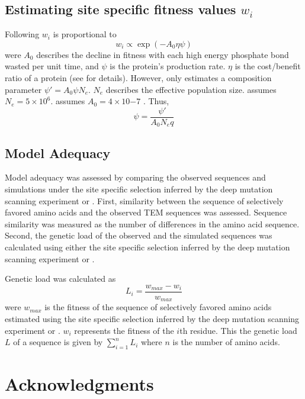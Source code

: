 \documentclass[12pt]{article}
\begin{document}
\subsection*{Estimating site specific fitness values $w_i$}

Following \citet{beaulieu2018} $w_i$ is proportional to
\begin{equation}
w_i \propto \exp(-A_0\eta\psi)
\end{equation}
were $A_0$ describes the decline in fitness with each high energy phosphate bond wasted per unit time, and $\psi$ is the protein's production rate.
$\eta$ is the cost/benefit ratio of a protein (see \citep{beaulieu2018} for details). 
However, \selac only estimates a composition parameter $\psi' = A_0\psi N_e$.
$N_e$ describes the effective population size.
\selac assumes $N_e = 5\times 10^6$.
\selac assumes $A_0 = 4 \times 10{-7}$ \citep{gilchrist2007}.
Thus, 
\begin{equation}
\psi = \frac{\psi'}{A_0N_eq}
\end{equation}


\subsection*{Model Adequacy}

Model adequacy was assessed by comparing the observed sequences and simulations under the site specific selection inferred by the deep mutation scanning experiment or \selac.
First, similarity between the sequence of selectively favored amino acids and the observed TEM sequences was assessed.
Sequence similarity was measured as the number of differences in the amino acid sequence.
Second, the genetic load of the observed and the simulated sequences was calculated using either the site specific selection inferred by the deep mutation scanning experiment or \selac.

Genetic load was calculated as
\begin{equation}
L_i = \frac{w_{max} - w_i}{w_{max}}
\end{equation}
were $w_{max}$ is the fitness of the sequence of selectively favored amino acids estimated using  the site specific selection inferred by the deep mutation scanning experiment or \selac.
$w_i$ represents the fitness of the $i$th residue.
This the genetic load $L$ of a sequence is given by $\sum_{i=1}^n L_i$ where $n$ is the number of amino acids.

\section*{Acknowledgments}
\end{document}
